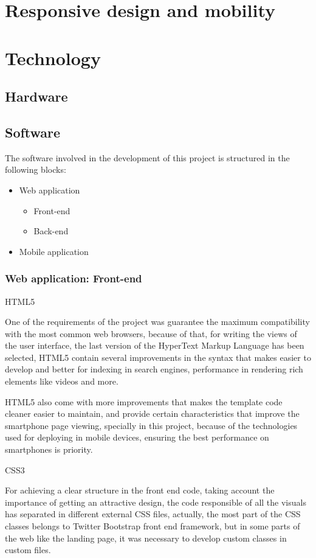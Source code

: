 \documentclass{DeustoFDP}
\begin{document}
\section{Responsive design and mobility}
\section{Technology}
\subsection{Hardware}
\subsection{Software}
The software involved in the development of this project is structured in the following blocks:
\begin{itemize}
	\item Web application
	\begin{itemize}
		\item Front-end
		\item Back-end
	\end{itemize}
	\item Mobile application
\end{itemize}

\subsubsection{Web application: Front-end}
{\large HTML5}

One of the requirements of the project was guarantee the maximum compatibility with the most common web browsers, because of that, for writing the views of the user interface, the last version of the HyperText Markup Language has been selected, HTML5 contain several improvements in the syntax that makes easier to develop and better for indexing in search engines, performance in rendering rich elements like videos and more.

HTML5 also come with more improvements that makes the template code cleaner easier to maintain, and provide certain characteristics that improve the smartphone page viewing, specially in this project, because of the technologies used for deploying in mobile devices, ensuring the best performance on smartphones is priority.

{\large CSS3}

For achieving a clear structure in the front end code, taking account the importance of getting an attractive design, the code responsible of all the visuals has separated in different external CSS files, actually, the most part of the CSS classes belongs to Twitter Bootstrap front end framework, but in some parts of the web like the landing page, it was necessary to develop custom classes in custom files.
\end{document}
